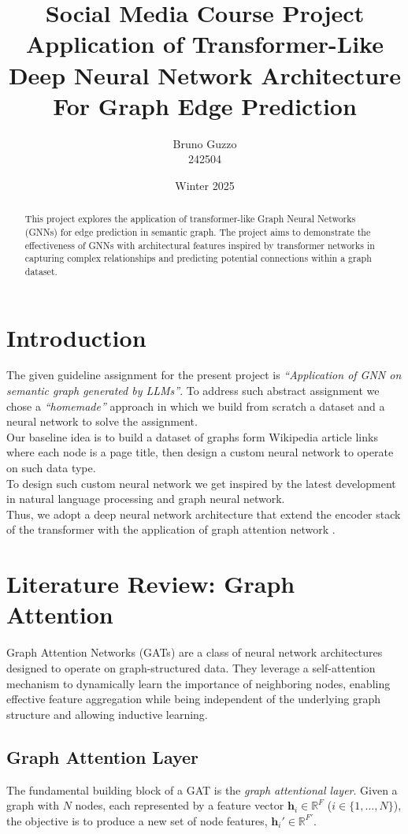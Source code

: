 \documentclass[11pt]{article}
\title{Social Media Course Project \\ [1em] \Large Application of Transformer-Like Deep Neural Network Architecture For Graph Edge Prediction}
\author{Bruno Guzzo \\ 242504}
\date{Winter 2025}
\begin{document}
	
	\maketitle
	
	\begin{abstract}
	This project explores the application of transformer-like Graph Neural Networks (GNNs) for edge prediction in semantic graph. The project aims to demonstrate the effectiveness of GNNs with architectural features inspired by transformer networks in capturing complex relationships and predicting potential connections within a graph dataset.
	\end{abstract}
	
	
	\section{Introduction}
	The given guideline assignment for the present project is \textit{``Application of GNN on semantic graph generated by LLMs''}. To address such abstract assignment we chose a \textit{``homemade''} approach in which we build from scratch a dataset and a neural network to solve the assignment. \\
	Our baseline idea is to build a dataset of graphs form Wikipedia article links where each node is a page title, then design a custom neural network to operate on such data type.\\
	To design such custom neural network we get inspired by the latest development in natural language processing and graph neural network. \\
	Thus, we adopt a deep neural network architecture that extend the encoder stack of the transformer \cite{vaswani2023attentionneed} with the application of graph attention network \cite{veličković2018graphattentionnetworks}.
	
	
	\section{Literature Review: Graph Attention}
	\label{graph_attention}
	Graph Attention Networks (GATs) are a class of neural network architectures designed to operate on graph-structured data. They leverage a self-attention mechanism \cite{vaswani2023attentionneed} to dynamically learn the importance of neighboring nodes, enabling effective feature aggregation while being independent of the underlying graph structure and allowing inductive learning.
	
	\subsection{Graph Attention Layer}
	The fundamental building block of a GAT \cite{veličković2018graphattentionnetworks} is the \textit{graph attentional layer}. Given a graph with $N$ nodes, each represented by a feature vector $\mathbf{h}_i \in \mathbb{R}^F$ ($i \in \{1, \dots, N\}$), the objective is to produce a new set of node features, $\mathbf{h}_i' \in \mathbb{R}^{F'}$.
	
\end{document}
